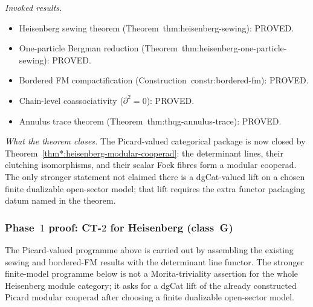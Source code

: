 \documentclass[11pt]{article}
\begin{document}
\noindent\emph{Invoked results.}
\begin{itemize}[nosep]
\item Heisenberg sewing theorem
  (Theorem~\textup{thm:heisenberg-sewing}): PROVED.
\item One-particle Bergman reduction
  (Theorem~\textup{thm:heisenberg-one-particle-sewing}): PROVED.
\item Bordered FM compactification
  (Construction~\textup{constr:bordered-fm}): PROVED.
\item Chain-level coassociativity ($\partial^2 = 0$): PROVED.
\item Annulus trace theorem
  (Theorem~\textup{thm:thqg-annulus-trace}): PROVED.
\end{itemize}

\noindent\emph{What the theorem closes.}
The Picard-valued categorical package is now closed by
Theorem~\ref{thm*:heisenberg-modular-cooperad}: the determinant
lines, their clutching isomorphisms, and their scalar Fock
fibres form a modular cooperad.  The only stronger statement not
claimed there is a dgCat-valued lift on a chosen finite
dualizable open-sector model; that lift requires the extra
functor packaging datum named in the theorem.

\subsubsection*{Phase~$1$ proof: CT-$2$ for Heisenberg (class~G)}
\label{par:ct2-heisenberg-proof}

The Picard-valued programme above is carried out by assembling
the existing sewing and bordered-FM results with the determinant
line functor.  The stronger finite-model programme below is not a
Morita-triviality assertion for the whole Heisenberg module
category; it asks for a dgCat lift of the already constructed
Picard modular cooperad after choosing a finite dualizable
open-sector model.
\end{document}

